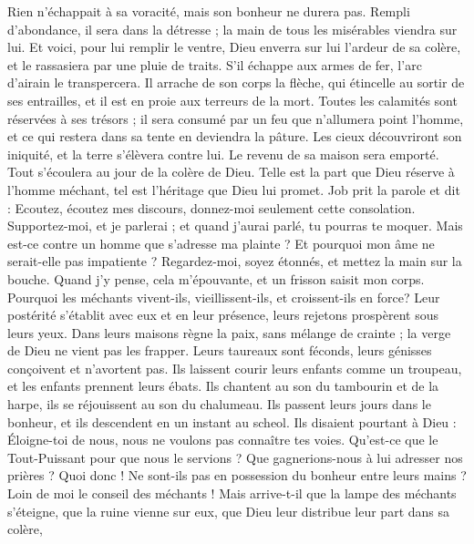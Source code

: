 \begin{multicols}{2}
Rien n'échappait à sa voracité, mais son bonheur ne durera pas.
Rempli d'abondance, il sera dans la détresse ; la main de tous les misérables viendra sur lui.
Et voici, pour lui remplir le ventre, Dieu enverra sur lui l'ardeur de sa colère, et le rassasiera par une pluie de traits.
S'il échappe aux armes de fer, l'arc d'airain le transpercera.
Il arrache de son corps la flèche, qui étincelle au sortir de ses entrailles, et il est en proie aux terreurs de la mort.
Toutes les calamités sont réservées à ses trésors ; il sera consumé par un feu que n'allumera point l'homme, et ce qui restera dans sa tente en deviendra la pâture.
Les cieux découvriront son iniquité, et la terre s'élèvera contre lui.
Le revenu de sa maison sera emporté. Tout s'écoulera au jour de la colère de Dieu.
Telle est la part que Dieu réserve à l'homme méchant, tel est l'héritage que Dieu lui promet.
\VerseOne{}Job prit la parole et dit :
Ecoutez, écoutez mes discours, donnez-moi seulement cette consolation.
Supportez-moi, et je parlerai ; et quand j'aurai parlé, tu pourras te moquer.
Mais est-ce contre un homme que s'adresse ma plainte ? Et pourquoi mon âme ne serait-elle pas impatiente ?
Regardez-moi, soyez étonnés, et mettez la main sur la bouche.
Quand j'y pense, cela m'épouvante, et un frisson saisit mon corps.
Pourquoi les méchants vivent-ils, vieillissent-ils, et croissent-ils en force?
Leur postérité s'établit avec eux et en leur présence, leurs rejetons prospèrent sous leurs yeux.
Dans leurs maisons règne la paix, sans mélange de crainte ; la verge de Dieu ne vient pas les frapper.
Leurs taureaux sont féconds, leurs génisses conçoivent et n'avortent pas.
Ils laissent courir leurs enfants comme un troupeau, et les enfants prennent leurs ébats.
Ils chantent au son du tambourin et de la harpe, ils se réjouissent au son du chalumeau.
Ils passent leurs jours dans le bonheur, et ils descendent en un instant au scheol.
Ils disaient pourtant à Dieu : Éloigne-toi de nous, nous ne voulons pas connaître tes voies.
Qu'est-ce que le Tout-Puissant pour que nous le servions ? Que gagnerions-nous à lui adresser nos prières ?
Quoi donc ! Ne sont-ils pas en possession du bonheur entre leurs mains ? Loin de moi le conseil des méchants !
Mais arrive-t-il que la lampe des méchants s'éteigne, que la ruine vienne sur eux, que Dieu leur distribue leur part dans sa colère,

\end{multicols}
